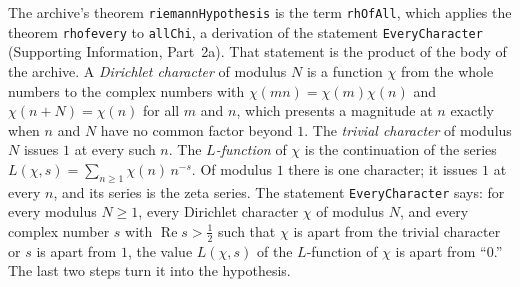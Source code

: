\documentclass[11pt]{article}
\theoremstyle{definition}
\theoremstyle{remark}
\newcommand{\re}{\operatorname{Re}}
\DeclareRobustCommand{\lean}[1]{{\renewcommand{\_}{\textunderscore\allowbreak}\texttt{#1}}}
\begin{document}
The archive's theorem \lean{riemannHypothesis} is the term \lean{rhOfAll}, which applies the theorem \lean{rh\_of\_every} to \lean{allChi}, a derivation of the statement \lean{EveryCharacter} (Supporting Information, Part~2a). That statement is the product of the body of the archive. A \emph{Dirichlet character} of modulus $N$ is a function $\chi$ from the whole numbers to the complex numbers with $\chi(mn)=\chi(m)\chi(n)$ and $\chi(n+N)=\chi(n)$ for all $m$ and $n$, which presents a magnitude at $n$ exactly when $n$ and $N$ have no common factor beyond $1$. The \emph{trivial character} of modulus $N$ issues $1$ at every such $n$. The \emph{$L$-function} of $\chi$ is the continuation of the series $L(\chi,s)=\sum_{n\ge1}\chi(n)\,n^{-s}$. Of modulus $1$ there is one character; it issues $1$ at every $n$, and its series is the zeta series. The statement \lean{EveryCharacter} says: for every modulus $N\ge1$, every Dirichlet character $\chi$ of modulus $N$, and every complex number $s$ with $\re s>\tfrac12$ such that $\chi$ is apart from the trivial character or $s$ is apart from $1$, the value $L(\chi,s)$ of the $L$-function of $\chi$ is apart from ``0.'' The last two steps turn it into the hypothesis.
\end{document}
